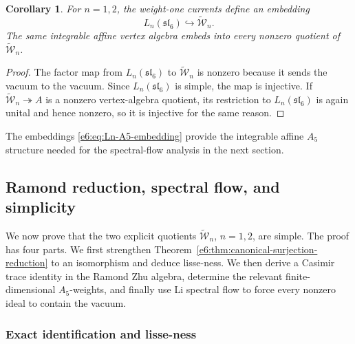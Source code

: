 \documentclass[11pt,reqno]{amsart}
\newtheorem{corollary}[theorem]{Corollary}
\theoremstyle{definition}
\theoremstyle{remark}
\begin{document}
\begin{corollary}
For $n=1,2$, the weight-one currents define an embedding
\begin{equation}\label{e6:eq:Ln-A5-embedding}
  L_n(\mathfrak{sl}_6)
  \hookrightarrow
  \widetilde{\mathcal W}_n.
\end{equation}
The same integrable affine vertex algebra embeds into every nonzero quotient of
$\widetilde{\mathcal W}_n$.
\end{corollary}

\begin{proof}
The factor map from $L_n(\mathfrak{sl}_6)$ to
$\widetilde{\mathcal W}_n$ is nonzero because it sends the vacuum to the vacuum.
Since $L_n(\mathfrak{sl}_6)$ is simple, the map is injective.  If
$\widetilde{\mathcal W}_n\twoheadrightarrow A$ is a nonzero vertex-algebra
quotient, its restriction to $L_n(\mathfrak{sl}_6)$ is again unital and hence
nonzero, so it is injective for the same reason.
\end{proof}

The embeddings \eqref{e6:eq:Ln-A5-embedding} provide the integrable affine
$A_5$ structure needed for the spectral-flow analysis in the next section.

\subsection{Ramond reduction, spectral flow, and simplicity}
\label{e6:sec:Ramond-spectral-flow-simplicity}

We now prove that the two explicit quotients
$\widetilde{\mathcal W}_n$, $n=1,2$, are simple.  The proof has four parts.  We
first strengthen Theorem~\ref{e6:thm:canonical-surjection-reduction} to an
isomorphism and deduce lisse-ness.  We then derive a Casimir trace identity in
the Ramond Zhu algebra, determine the relevant finite-dimensional
$A_5$-weights, and finally use Li spectral flow to force every nonzero ideal to
contain the vacuum.

\subsubsection{Exact identification and lisse-ness}
\label{e6:subsec:exact-identification-lisse}
\end{document}
